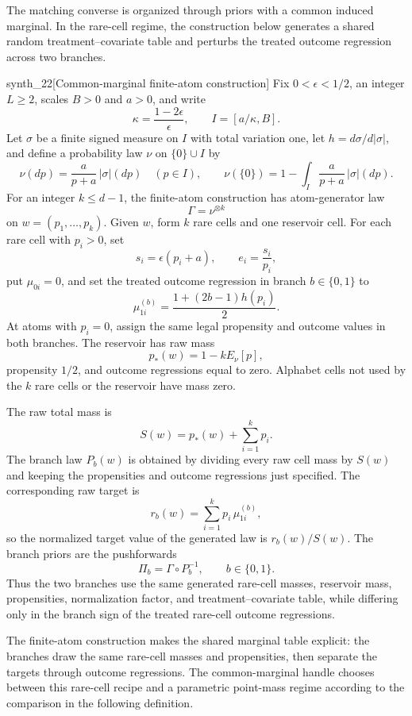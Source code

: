 The matching converse is organized through priors with a common induced marginal. In the rare-cell regime, the construction below generates a shared random treatment--covariate table and perturbs the treated outcome regression across two branches.

\begin{definitionv}{synth_22}[Common-marginal finite-atom construction]
Fix \(0<\epsilon<1/2\), an integer \(L\ge2\), scales \(B>0\) and \(a>0\), and write
\[
\kappa=\frac{1-2\epsilon}{\epsilon},\qquad I=[a/\kappa,B].
\]
Let \(\sigma\) be a finite signed measure on \(I\) with total variation one, let
\(h=d\sigma/d|\sigma|\), and define a probability law \(\nu\) on \(\{0\}\cup I\) by
\[
\nu(dp)=\frac{a}{p+a}\,|\sigma|(dp)\quad(p\in I),
\qquad
\nu(\{0\})=1-\int_I\frac{a}{p+a}\,|\sigma|(dp).
\]
For an integer \(k\le d-1\), the finite-atom construction has atom-generator law
\[
\Gamma=\nu^{\otimes k}
\]
on \(w=(p_1,\ldots,p_k)\).  Given \(w\), form \(k\) rare cells and one reservoir cell.  For each rare cell with \(p_i>0\), set
\[
s_i=\epsilon(p_i+a),\qquad e_i=\frac{s_i}{p_i},
\]
put \(\mu_{0i}=0\), and set the treated outcome regression in branch \(b\in\{0,1\}\) to
\[
\mu_{1i}^{(b)}=\frac{1+(2b-1)h(p_i)}{2}.
\]
At atoms with \(p_i=0\), assign the same legal propensity and outcome values in both branches.  The reservoir has raw mass
\[
p_*(w)=1-kE_\nu[p],
\]
propensity \(1/2\), and outcome regressions equal to zero.  Alphabet cells not used by the \(k\) rare cells or the reservoir have mass zero.

The raw total mass is
\[
S(w)=p_*(w)+\sum_{i=1}^k p_i.
\]
The branch law \(P_b(w)\) is obtained by dividing every raw cell mass by \(S(w)\) and keeping the propensities and outcome regressions just specified.  The corresponding raw target is
\[
r_b(w)=\sum_{i=1}^k p_i\,\mu_{1i}^{(b)},
\]
so the normalized target value of the generated law is \(r_b(w)/S(w)\).  The branch priors are the pushforwards
\[
\Pi_b=\Gamma\circ P_b^{-1},\qquad b\in\{0,1\}.
\]
Thus the two branches use the same generated rare-cell masses, reservoir mass, propensities, normalization factor, and treatment--covariate table, while differing only in the branch sign of the treated rare-cell outcome regressions.
\end{definitionv}

The finite-atom construction makes the shared marginal table explicit: the branches draw the same rare-cell masses and propensities, then separate the targets through outcome regressions. The common-marginal handle chooses between this rare-cell recipe and a parametric point-mass regime according to the comparison in the following definition.

